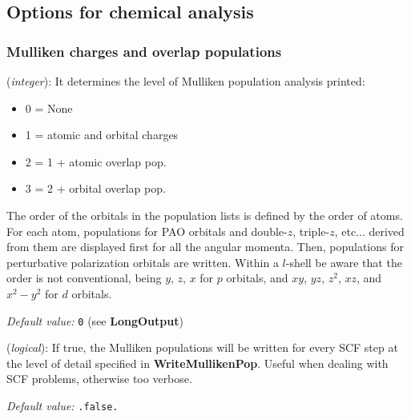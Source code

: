 \subsection{Options for chemical analysis}

\subsubsection{Mulliken charges and overlap populations}
\begin{description}
\itemsep 10pt
\parsep 0pt

\item[\textbf{WriteMullikenPop}] (\textit{integer}):
It determines the level of Mulliken population analysis printed:
\begin{itemize}
\item 0 = None
\item 1 = atomic and orbital charges
\item 2 = 1 + atomic overlap pop.
\item 3 = 2 + orbital overlap pop.
\end{itemize}
The order of the orbitals in the population lists is defined
by the order of atoms. For each atom, populations for PAO orbitals and
double-$z$, triple-$z$, etc... derived from them are displayed first for
all the angular momenta. Then, populations for perturbative polarization
orbitals are written.
Within a $l$-shell be aware that the order is not
conventional, being $y$, $z$, $x$ for $p$ orbitals, and
$xy$, $yz$, $z^2$, $xz$, and $x^2-y^2$ for $d$ orbitals.

\textit{Default value:} \texttt{0} (see \textbf{LongOutput})


\item[\textbf{MullikenInSCF}] (\textit{logical}):
If true, the Mulliken populations will be written for every SCF step
at the level of detail specified in \textbf{WriteMullikenPop}. Useful
when dealing with SCF problems, otherwise too verbose.

\textit{Default value:} \texttt{.false.}

\end{description}

